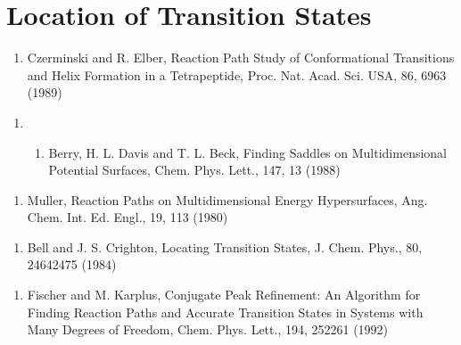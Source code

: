 \documentclass[letterpaper,11pt,english]{sphinxmanual}
\begin{document}
\section{Location of Transition States}
\label{\detokenize{text/references:location-of-transition-states}}\begin{enumerate}
%
\setcounter{enumi}{17}
\item {} 
Czerminski and R. Elber, Reaction Path Study of Conformational Transitions and Helix Formation in a Tetrapeptide, Proc. Nat. Acad. Sci. USA, 86, 6963 (1989)

\end{enumerate}
\begin{enumerate}
%
\setcounter{enumi}{17}
\item {} \begin{enumerate}
%
\setcounter{enumii}{18}
\item {} 
Berry, H. L. Davis and T. L. Beck, Finding Saddles on Multidimensional Potential Surfaces, Chem. Phys. Lett., 147, 13 (1988)

\end{enumerate}

\end{enumerate}
\begin{enumerate}
%
\setcounter{enumi}{10}
\item {} 
Muller, Reaction Paths on Multidimensional Energy Hypersurfaces, Ang. Chem. Int. Ed. Engl., 19, 1\sphinxhyphen{}13 (1980)

\end{enumerate}
\begin{enumerate}
%
\setcounter{enumi}{18}
\item {} 
Bell and J. S. Crighton, Locating Transition States, J. Chem. Phys., 80, 2464\sphinxhyphen{}2475 (1984)

\end{enumerate}
\begin{enumerate}
%
\setcounter{enumi}{18}
\item {} 
Fischer and M. Karplus, Conjugate Peak Refinement: An Algorithm for Finding Reaction Paths and Accurate Transition States in Systems with Many Degrees of Freedom, Chem. Phys. Lett., 194, 252\sphinxhyphen{}261 (1992)

\end{enumerate}
\end{document}
